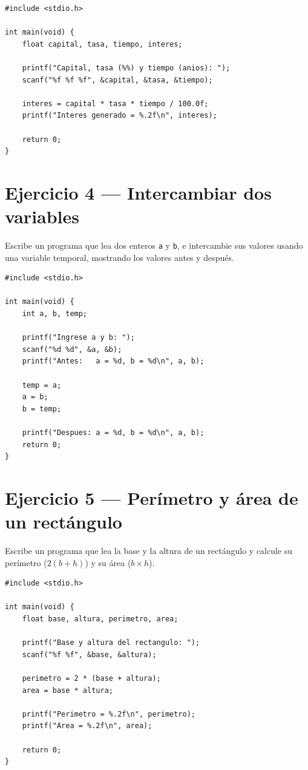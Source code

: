 \documentclass[11pt,letterpaper]{article}
\begin{document}
\begin{lstlisting}
#include <stdio.h>

int main(void) {
    float capital, tasa, tiempo, interes;

    printf("Capital, tasa (%%) y tiempo (anios): ");
    scanf("%f %f %f", &capital, &tasa, &tiempo);

    interes = capital * tasa * tiempo / 100.0f;
    printf("Interes generado = %.2f\n", interes);

    return 0;
}
\end{lstlisting}

\section*{Ejercicio 4 --- Intercambiar dos variables}
Escribe un programa que lea dos enteros \texttt{a} y \texttt{b}, e intercambie sus valores usando
una variable temporal, mostrando los valores antes y después.

\begin{lstlisting}
#include <stdio.h>

int main(void) {
    int a, b, temp;

    printf("Ingrese a y b: ");
    scanf("%d %d", &a, &b);
    printf("Antes:   a = %d, b = %d\n", a, b);

    temp = a;
    a = b;
    b = temp;

    printf("Despues: a = %d, b = %d\n", a, b);
    return 0;
}
\end{lstlisting}

\section*{Ejercicio 5 --- Perímetro y área de un rectángulo}
Escribe un programa que lea la base y la altura de un rectángulo y calcule su perímetro
($2(b+h)$) y su área ($b \times h$).

\begin{lstlisting}
#include <stdio.h>

int main(void) {
    float base, altura, perimetro, area;

    printf("Base y altura del rectangulo: ");
    scanf("%f %f", &base, &altura);

    perimetro = 2 * (base + altura);
    area = base * altura;

    printf("Perimetro = %.2f\n", perimetro);
    printf("Area = %.2f\n", area);

    return 0;
}
\end{lstlisting}
\end{document}
